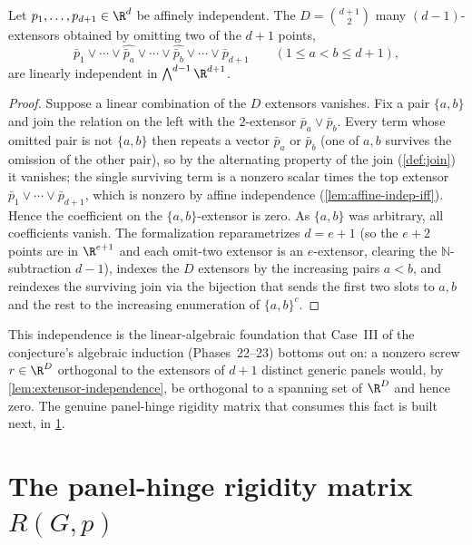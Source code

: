 \begin{lemma}
  \label{lem:extensor-independence}
  \leanok
  Let $p_1, \dots, p_{d+1} \in \R^{d}$ be affinely independent. The
  $D = \binom{d+1}{2}$ many $(d-1)$-extensors obtained by omitting two of
  the $d+1$ points,
  \[
    \bar p_1 \vee \cdots \vee \widehat{\bar p_a} \vee \cdots
      \vee \widehat{\bar p_b} \vee \cdots \vee \bar p_{d+1}
    \qquad (1 \le a < b \le d+1),
  \]
  are linearly independent in $\bigwedge^{d-1} \R^{d+1}$.
\end{lemma}
\begin{proof}
  \leanok
  Suppose a linear combination of the $D$ extensors vanishes. Fix a pair
  $\{a, b\}$ and join the relation on the left with the $2$-extensor
  $\bar p_a \vee \bar p_b$. Every term whose omitted pair is not
  $\{a, b\}$ then repeats a vector $\bar p_a$ or $\bar p_b$ (one of $a, b$
  survives the omission of the other pair), so by the alternating property
  of the join (\cref{def:join}) it vanishes; the single surviving term is a
  nonzero scalar times the top extensor $\bar p_1 \vee \cdots \vee \bar
  p_{d+1}$, which is nonzero by affine independence
  (\cref{lem:affine-indep-iff}). Hence the coefficient on the
  $\{a, b\}$-extensor is zero. As $\{a, b\}$ was arbitrary, all
  coefficients vanish. The formalization reparametrizes $d = e + 1$ (so
  the $e + 2$ points are in $\R^{e+1}$ and each omit-two extensor is an
  $e$-extensor, clearing the $\mathbb{N}$-subtraction $d - 1$), indexes
  the $D$ extensors by the increasing pairs $a < b$, and reindexes the
  surviving join via the bijection that sends the first two slots to
  $a, b$ and the rest to the increasing enumeration of $\{a, b\}^{c}$.
\end{proof}

This independence is the linear-algebraic foundation that Case~III of
the conjecture's algebraic induction (Phases~22--23) bottoms out on: a
nonzero screw $r \in \R^{D}$ orthogonal to the extensors of $d+1$
distinct generic panels would, by \cref{lem:extensor-independence}, be
orthogonal to a spanning set of $\R^{D}$ and hence zero. The genuine
panel-hinge rigidity matrix that consumes this fact is built next, in
\cref{sec:molecular-rigidity-matrix}.

\section{The panel-hinge rigidity matrix \texorpdfstring{$R(G,p)$}{R(G,p)}}
\label{sec:molecular-rigidity-matrix}

